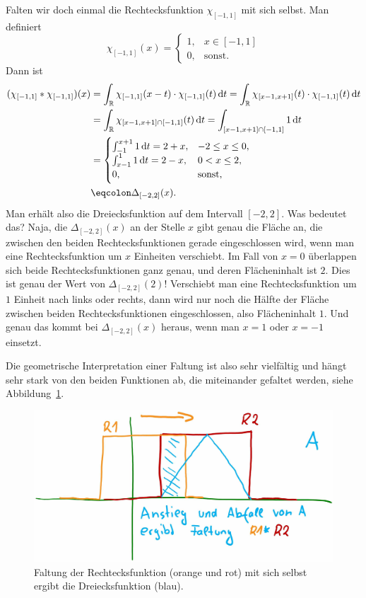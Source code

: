 \begin{example}[Faltung]
Falten wir doch einmal die Rechtecksfunktion $ \chi_{[-1,1]} $ mit sich selbst. Man definiert
\[
  \chi_{[-1,1]}(x) = \begin{cases} 1, & x \in [-1,1] \\ 0, & \text{sonst}. \end{cases}
\]
Dann ist
\begin{align*}
   (\chi_{[-1,1]} * \chi_{[-1,1]})(x) 
&= \int_{\R} \chi_{[-1,1]}(x - t) \cdot \chi_{[-1,1]}(t) \dif t
 = \int_{\R} \chi_{[x - 1, x + 1]}(t) \cdot \chi_{[-1,1]}(t) \dif t \\
&= \int_{\R} \chi_{[x - 1, x + 1] \cap [-1,1]}(t) \dif t
 = \int_{[x - 1, x + 1] \cap [-1,1]} 1 \dif t \\
&= \begin{cases}
      \int_{-1}^{x+1} 1 \dif t = 2 + x, & -2 \leq x \leq 0, \\
      \int_{x-1}^{1} 1 \dif t = 2 - x, & 0 < x \leq 2, \\
      0, & \text{sonst},
   \end{cases} \\
&\eqcolon \Delta_{[-2,2]}(x).
\end{align*}
Man erhält also die Dreiecksfunktion auf dem Intervall $ [-2,2] $. Was bedeutet das? Naja, die
$ \Delta_{[-2,2]}(x) $ an der Stelle $ x $ gibt genau die Fläche an, die zwischen den beiden 
Rechtecksfunktionen gerade eingeschlossen wird, wenn man eine Rechtecksfunktion um $ x $ Einheiten
verschiebt. Im Fall von $ x = 0 $ überlappen sich beide Rechtecksfunktionen ganz genau, und deren
Flächeninhalt ist $ 2 $. Dies ist genau der Wert von $ \Delta_{[-2,2]}(2) $! Verschiebt man eine
Rechtecksfunktion um $ 1 $ Einheit nach links oder rechts, dann wird nur noch die Hälfte der
Fläche zwischen beiden Rechtecksfunktionen eingeschlossen, also Flächeninhalt $ 1 $. Und genau das
kommt bei $ \Delta_{[-2,2]}(x) $ heraus, wenn man $ x = 1 $ oder $ x = -1 $ einsetzt.

Die geometrische Interpretation einer Faltung ist also sehr vielfältig und hängt sehr stark von den
beiden Funktionen ab, die miteinander gefaltet werden, siehe Abbildung~\ref{fig:faltung}.
\begin{figure}[ht]
	\centering
	\includegraphics[width=0.7\linewidth]{Bilder/Faltung}
	\caption{Faltung der Rechtecksfunktion (orange und rot) mit sich selbst ergibt die 
  	Dreiecksfunktion (blau).}
	\label{fig:faltung}
\end{figure}
\end{example}

